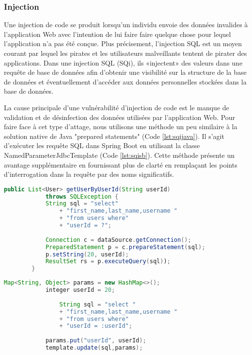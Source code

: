     \subsubsection{Injection}
        Une injection de code se produit lorsqu'un individu envoie des données 
        invalides à l'application Web avec l'intention de lui faire faire quelque 
        chose pour lequel l'application n'a pas été conçue. Plus précisement,
        l'injection SQL est un moyen courant par lequel les pirates et les 
        utilisateurs malveillants tentent de pirater des applications. Dans une 
        injection SQL (SQi), ils «injectent» des valeurs dans une requête de base de 
        données afin d’obtenir une visibilité sur la structure de la base de 
        données et éventuellement d’accéder aux données personnelles stockées 
        dans la base de données.
        \par 
        La cause principale d'une vulnérabilité d'injection de code est le manque 
        de validation et de désinfection des données utilisées par l'application Web.
        Pour faire face à cet type d'attage, nous utilisons une méthode un peu similaire
        à la solution native de Java "prepared statements" (Code \ref{lst:sqijava}). Il s'agit d'exécuter les 
        requête SQL dans Spring Boot en utilisant la classe NamedParameterJdbcTemplate (Code \ref{lst:sqisb}). 
        Cette méthode présente un avantage supplémentaire en fournissant plus de clarté en 
        remplaçant les points d'interrogation dans la requête par des noms significatifs.
        \begin{lstlisting}[caption={Éviter SQi en Java: Prepared statements},label={lst:sqijava},language=Java]
            public List<User> getUserByUserId(String userId)
            throws SQLException {    
            String sql = "select"
                + "first_name,last_name,username "
                + "from users where"
                + "userId = ?";
            
            Connection c = dataSource.getConnection();
            PreparedStatement p = c.prepareStatement(sql);
            p.setString(20, userId);
            ResultSet rs = p.executeQuery(sql)); 
        }
        \end{lstlisting}

        \begin{lstlisting}[caption={Éviter SQi avec Spring Boot: NamedParameterJdbcTemplate},label={lst:sqisb},language=Java]
            Map<String, Object> params = new HashMap<>();
            integer userId = 20;
            
                String sql = "select "
                + "first_name,last_name,username "
                + "from users where"
                + "userId = :userId";
            
            params.put("userId", userId);
            template.update(sql,params);
        \end{lstlisting}
